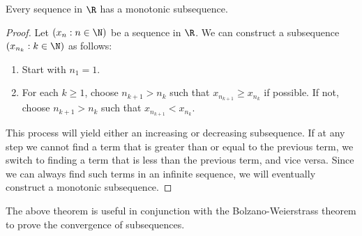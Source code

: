 \documentclass[openany]{book}
\begin{document}
\begin{mytheorem}
    Every sequence in $\R$ has a monotonic subsequence.
\end{mytheorem}
\begin{proof}
    Let $(x_n : n \in \N)$ be a sequence in $\R$. We can construct a subsequence $(x_{n_k} : k \in \N)$ as follows:
    \begin{enumerate}
        \item Start with $n_1 = 1$.
        \item For each $k \geq 1$, choose $n_{k+1} > n_k$ such that $x_{n_{k+1}} \geq x_{n_k}$ if possible. If not, choose $n_{k+1} > n_k$ such that $x_{n_{k+1}} < x_{n_k}$.
    \end{enumerate}
    This process will yield either an increasing or decreasing subsequence. If at any step we cannot find a term that is greater than or equal to the previous term, we switch to finding a term that is less than the previous term, and vice versa. Since we can always find such terms in an infinite sequence, we will eventually construct a monotonic subsequence.
\end{proof}
\begin{mynote}
    The above theorem is useful in conjunction with the Bolzano-Weierstrass theorem to prove the convergence of subsequences.
\end{mynote}
\end{document}
